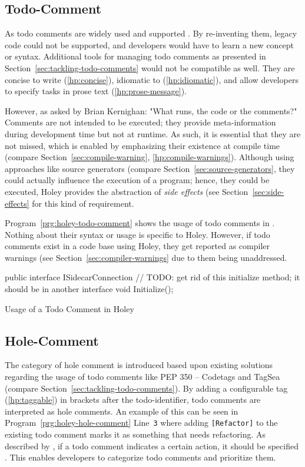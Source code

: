 \subsection{Todo-Comment}
As todo comments are widely used and supported \cite{jetbrains_todo_2023}.
By re-inventing them, legacy code could not be supported, and developers would have to learn a new concept or syntax.
Additional tools for managing todo comments as presented in Section~\ref{sec:tackling-todo-comments} would not be compatible as well.
They are concise to write (\ref{hp:concise}), idiomatic to \CS (\ref{hp:idiomatic}), and allow developers to specify tasks in prose text (\ref{hp:prose-message}).

However, as asked by Brian Kernighan: "What runs, the code or the comments?"
Comments are not intended to be executed; they provide meta-information during development time but not at runtime.
As such, it is essential that they are not missed, which is enabled by emphasizing their existence at compile time (compare Section~\ref{sec:compile-warning}, \ref{hp:compile-warnings}).
Although using approaches like source generators (compare Section~\ref{sec:source-generators}, they could actually influence the execution of a program; hence, they could be executed, Holey provides the abstraction of \emph{side effects} (see Section~\ref{sec:side-effects} for this kind of requirement.

Program~\ref{prg:holey-todo-comment} shows the usage of todo comments in \CS.
Nothing about their syntax or usage is specific to Holey.
However, if todo comments exist in a code base using Holey, they get reported as compiler warnings (see Section~\ref{sec:compiler-warnings} due to them being unaddressed.

\begin{program}[ht]
\begin{CsCode}
public interface ISidecarConnection
{
	// TODO: get rid of this initialize method; it should be in another interface
	void Initialize();
}
\end{CsCode}
\caption{Usage of a Todo Comment in Holey}
\label{prg:holey-todo-comment}
\end{program}

\subsection{Hole-Comment}
The category of hole comment is introduced based upon existing solutions regarding the usage of todo comments like PEP 350 -- Codetags and TagSea (compare Section~\ref{sec:tackling-todo-comments}).
By adding a configurable tag (\ref{hp:taggable}) in brackets after the todo-identifier, todo comments are interpreted as hole comments.
An example of this can be seen in Program~\ref{prg:holey-hole-comment} Line~\verb|3| where adding \verb|[Refactor]| to the existing todo comment marks it as something that needs refactoring.
As described by \citeauthor{goldin_stop_2022}, if a todo comment indicates a certain action, it should be specified \cite{goldin_stop_2022}.
This enables developers to categorize todo comments and prioritize them.

